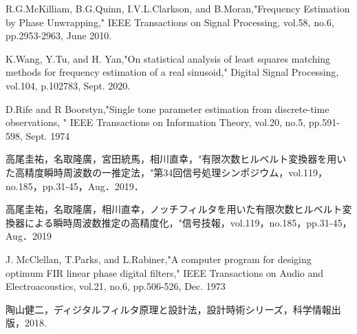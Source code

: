 \documentclass[technicalreport]{ieicej}
\begin{document}
%
%
\begin{thebibliography}{99}%
R.G.McKilliam, B.G.Quinn, I.V.L.Clarkson, and B.Moran,"Frequency Estimation by Phase Unwrapping," IEEE Transactions on Signal Processing, vol.58, no.6, pp.2953-2963, June 2010.

K.Wang, Y.Tu, and H. Yan,"On statistical analysis of least squares matching methods for frequency estimation of a real sinusoid," Digital Signal Processing, vol.104, p.102783, Sept. 2020.

D.Rife and R Boorstyn,"Single tone parameter estimation from discrete-time observations, " IEEE Transactions on Information Theory, vol.20, no.5, pp.591-598, Sept. 1974

高尾圭祐，名取隆廣，宮田統馬，相川直幸，"有限次数ヒルベルト変換器を用いた高精度瞬時周波数の一推定法，"第34回信号処理シンポジウム，vol.119，no.185，pp.31-45，Aug．2019．

高尾圭祐，名取隆廣，相川直幸，ノッチフィルタを用いた有限次数ヒルベルト変換器による瞬時周波数推定の高精度化，"信号技報，vol.119，no.185，pp.31-45，Aug．2019

J. McClellan, T.Parks, and L.Rabiner,"A computer program for desiging optimum FIR linear phase digital filters," IEEE Transactions on Audio and Electroacoustics, vol.21, no.6, pp.506-526, Dec. 1973

陶山健二，ディジタルフィルタ原理と設計法，設計時術シリーズ，科学情報出版，2018.
\end{thebibliography}
\end{document}
